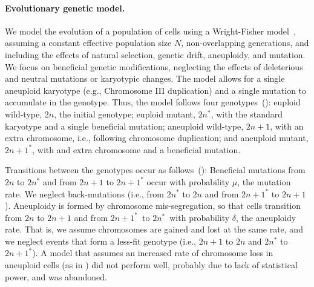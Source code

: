 \documentclass[12pt]{article}
\newcommand{\euwt}{\emph{$2n$}}
\newcommand{\anwt}{\emph{$2n+1$}}
\newcommand{\eumt}{\emph{$2n^*$}}
\newcommand{\anmt}{\emph{$2n+1^*$}}
\begin{document}
\paragraph{Evolutionary genetic model.}
We model the evolution of a population of cells using a Wright-Fisher model~\citep{Otto2007}, assuming a constant effective population size $N$, non-overlapping generations, and including the effects of natural selection, genetic drift, aneuploidy, and mutation. 
We focus on beneficial genetic modifications, neglecting the effects of deleterious and neutral mutations or karyotypic changes.
The model allows for a single aneuploid karyotype (e.g., Chromosome III duplication) and a single mutation to accumulate in the genotype.
Thus, the model follows four genotypes~(): euploid wild-type, \euwt, the initial genotype; 
euploid mutant, \eumt, with the standard karyotype and a single beneficial mutation; 
aneuploid wild-type, \anwt, with an extra chromosome, i.e., following chromosome duplication; and
aneuploid mutant, \anmt, with and extra chromosome and a beneficial mutation. 

Transitions between the genotypes occur as follows~(): Beneficial mutations from \euwt\; to \eumt\; and from \anwt\; to \anmt\; occur with probability $\mu$, the mutation rate. We neglect back-mutations (i.e., from \eumt\; to \euwt\; and from \anmt\; to \anwt).
Aneuploidy is formed by chromosome mis-segregation, so that cells transition from \euwt\; to \anwt\; and from \anmt\ to \eumt\ with probability $\delta$, the aneuploidy rate. That is, we assume chromosomes are gained and lost at the same rate, and we neglect events that form a less-fit genotype (i.e., \anwt\; to \euwt\; and \eumt\; to \anmt). A model that assumes an increased rate of chromosome loss in aneuploid cells (as in \citet{Sheltzer2011b}) did not perform well, probably due to lack of statistical power, and was abandoned.
\end{document}
